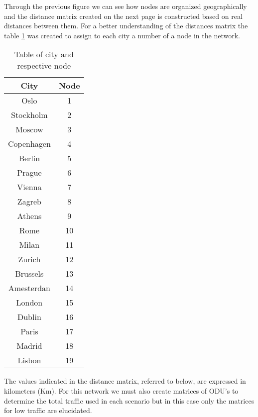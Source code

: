 \newpage
Through the previous figure we can see how nodes are organized geographically and the distance matrix created on the next page is constructed based on real distances between them.
For a better understanding of the distances matrix the table \ref{city_nodes_realnet} was created to assign to each city a number of a node in the network.


\begin{table}[h!]
\centering
\begin{tabular}{|| c | c ||}
 \hline
 City & Node \\
 \hline\hline
 Oslo & 1 \\
 Stockholm & 2 \\
 Moscow & 3 \\
 Copenhagen & 4 \\
 Berlin & 5 \\
 Prague & 6 \\
 Vienna & 7 \\
 Zagreb & 8 \\
 Athens & 9 \\
 Rome & 10 \\
 Milan & 11 \\
 Zurich & 12 \\
 Brussels & 13 \\
 Amesterdan & 14 \\
 London & 15 \\
 Dublin & 16 \\
 Paris & 17 \\
 Madrid & 18 \\
 Lisbon & 19 \\
 \hline
\end{tabular}
\caption{Table of city and respective node}
\label{city_nodes_realnet}
\end{table}


The values indicated in the distance matrix, referred to below, are expressed in kilometers (Km).
For this network we must also create matrices of ODU's to determine the total traffic used in each scenario but in this case only the matrices for low traffic are elucidated.

